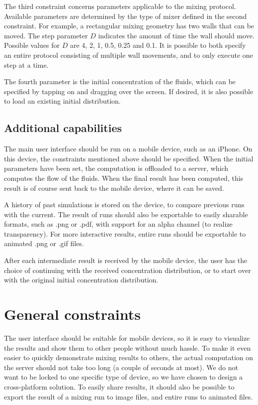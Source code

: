 The third constraint concerns parameters applicable to the mixing protocol. Available parameters are determined by the type of mixer defined in the second constraint. For example, a rectangular mixing geometry has two walls that can be moved. The step parameter $D$ indicates the amount of time the wall should move. Possible values for $D$ are 4, 2, 1, 0.5, 0.25 and 0.1. It is possible to both specify an entire protocol consisting of multiple wall movements, and to only execute one step at a time. %

The fourth parameter is the initial concentration of the fluids, which can be specified by tapping on and dragging over the screen. If desired, it is also possible to load an existing initial distribution.

\subsection{Additional capabilities}
The main user interface should be run on a mobile device, such as an iPhone. On this device, the constraints mentioned above should be specified. When the initial parameters have been set, the computation is offloaded to a server, which computes the flow of the fluids. %
When the final result has been computed, this result is of course sent back to the mobile device, where it can be saved.

A history of past simulations is stored on the device, to compare previous runs with the current. The result of runs should also be exportable to easily sharable formats, such as .png or .pdf, with support for an alpha channel (to realize transparency). For more interactive results, entire runs should be exportable to animated .png or .gif files. %

After each intermediate result is received by the mobile device, the user has the choice of continuing with the received concentration distribution, or to start over with the original initial concentration distribution.

\section{General constraints}
The user interface should be suitable for mobile devices, so it is easy to visualize the results and show them to other people without much hassle. To make it even easier to quickly demonstrate mixing results to others, the actual computation on the server should not take too long (a couple of seconds at most). We do not want to be locked to one specific type of device, so we have chosen to design a cross-platform solution. To easily share results, it should also be possible to export the result of a mixing run to image files, and entire runs to animated files.

